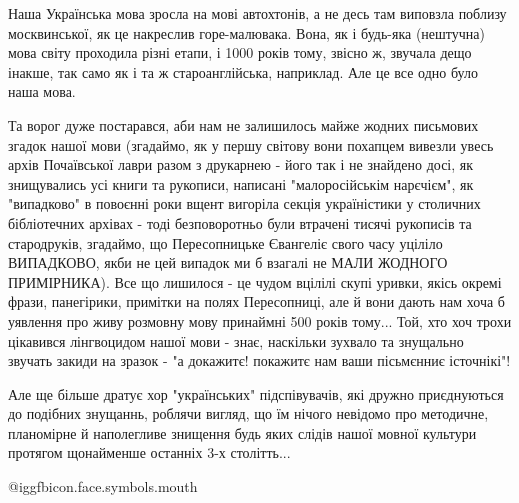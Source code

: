 Наша Українська мова зросла на мові автохтонів, а не десь там виповзла поблизу
москвинської, як це накреслив горе-малювака. Вона, як і будь-яка (нештучна)
мова світу проходила різні етапи, і 1000 років тому, звісно ж, звучала дещо
інакше, так само як і та ж староанглійська, наприклад. Але це все одно було
наша мова. 

Та ворог дуже постарався, аби нам не залишилось майже жодних письмових згадок
нашої мови (згадаймо, як у першу світову вони похапцем вивезли увесь архів
Почаївської лаври разом з друкарнею - його так і не знайдено досі, як
знищувались усі книги та рукописи, написані "малоросійськім нарєчієм", як
"випадково" в повоєнні роки вщент вигоріла секція україністики у столичних
бібліотечних архівах - тоді безповоротньо були втрачені тисячі рукописів та
стародруків, згадаймо, що Пересопницьке Євангеліє свого часу уціліло ВИПАДКОВО,
якби не цей випадок ми б взагалі не МАЛИ ЖОДНОГО ПРИМІРНИКА). Все що лишилося -
це чудом вцілілі скупі уривки, якісь окремі фрази, панегірики, примітки на
полях Пересопниці, але й вони дають нам хоча б уявлення про живу розмовну мову
принаймні 500 років тому... Той, хто хоч трохи цікавився лінгвоцидом нашої мови
- знає, наскільки зухвало та знущально звучать закиди на зразок - "а докажитє!
покажитє нам ваши пісьмєнниє істочнікі"!

Але ще більше дратує хор "українських" підспівувачів, які дружно приєднуються
до подібних знущаннь, роблячи вигляд, що їм нічого невідомо про методичне,
планомірне й наполегливе знищення будь яких слідів нашої мовної культури
протягом щонайменше останніх 3-х столітть...

 @igg{fbicon.face.symbols.mouth} 

